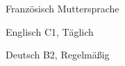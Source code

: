 

\begin{cvpairs}

  
\cvpair
    {Französisch} %
    {Muttersprache} %


\cvpair
    {Englisch} %
    {C1, Täglich} %


\cvpair
    {Deutsch} %
    {B2, Regelmäßig} %

\end{cvpairs}